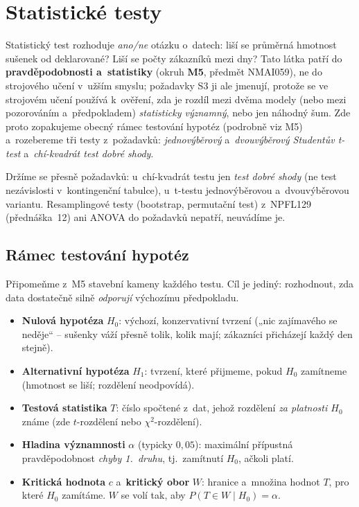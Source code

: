 \section{Statistické testy}\label{sec:testy}

Statistický test rozhoduje \emph{ano/ne} otázku o~datech: liší se průměrná hmotnost sušenek od deklarované? Liší se počty zákazníků mezi dny? Tato látka patří do \textbf{pravděpodobnosti a~statistiky} (okruh \textbf{M5}, předmět NMAI059), ne do strojového učení v~užším smyslu; požadavky S3 ji ale jmenují, protože se ve strojovém učení používá k~ověření, zda je rozdíl mezi dvěma modely (nebo mezi pozorováním a~předpokladem) \emph{statisticky významný}, nebo jen náhodný šum. Zde proto zopakujeme obecný rámec testování hypotéz (podrobně viz M5) a~rozebereme tři testy z~požadavků: \emph{jednovýběrový} a~\emph{dvouvýběrový Studentův t-test} a~\emph{chí-kvadrát test dobré shody}.

\begin{poznamka}[Rozsah]
Držíme se přesně požadavků: u~chí-kvadrát testu jen \emph{test dobré shody} (ne test nezávislosti v~kontingenční tabulce), u~t-testu jednovýběrovou a~dvouvýběrovou variantu. Resamplingové testy (bootstrap, permutační test) z~NPFL129 (přednáška~12) ani ANOVA do požadavků nepatří, neuvádíme je.
\end{poznamka}

\subsection{Rámec testování hypotéz}

Připomeňme z~M5 stavební kameny každého testu. Cíl je jediný: rozhodnout, zda data dostatečně silně \emph{odporují} výchozímu předpokladu.

\begin{definice}
\begin{itemize}
  \item \textbf{Nulová hypotéza} $H_0$: výchozí, konzervativní tvrzení („nic zajímavého se neděje`` -- sušenky váží přesně tolik, kolik mají; zákazníci přicházejí každý den stejně).
  \item \textbf{Alternativní hypotéza} $H_1$: tvrzení, které přijmeme, pokud $H_0$ zamítneme (hmotnost se liší; rozdělení neodpovídá).
  \item \textbf{Testová statistika} $T$: číslo spočtené z~dat, jehož rozdělení \emph{za platnosti $H_0$} známe (zde $t$-rozdělení nebo $\chi^2$-rozdělení).
  \item \textbf{Hladina významnosti} $\alpha$ (typicky $0{,}05$): maximální přípustná pravděpodobnost \emph{chyby 1.~druhu}, tj.\ zamítnutí $H_0$, ačkoli platí.
  \item \textbf{Kritická hodnota} $c$ a~\textbf{kritický obor} $W$: hranice a~množina hodnot $T$, pro které $H_0$ zamítáme. $W$ se volí tak, aby $P(T\in W\mid H_0)=\alpha$.
\end{itemize}
\end{definice}

